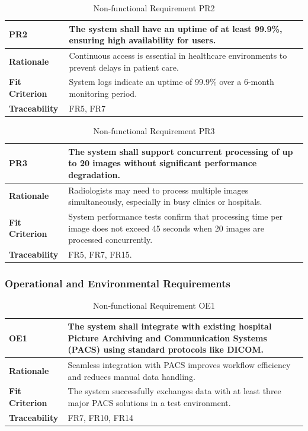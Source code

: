 \documentclass[12pt]{article}
\begin{document}
\begin{table}[h!]
\centering
{}
\begin{tabular}{|p{3.5cm}|p{11.5cm}|}
\hline
\rowcolor{gray!30}
\textbf{PR2} & The system shall have an uptime of at least 99.9\%, ensuring high availability for users. \\
\hline
\textbf{Rationale} & Continuous access is essential in healthcare environments to prevent delays in patient care. \\
\hline
\textbf{Fit Criterion} & System logs indicate an uptime of 99.9\% over a 6-month monitoring period. \\
\hline
\textbf{Traceability} & FR5, FR7 \\
\hline
\end{tabular}
\caption{Non-functional Requirement PR2}
\end{table}

\begin{table}[h!]
\centering
{}
\begin{tabular}{|p{3.5cm}|p{11.5cm}|}
\hline
\rowcolor{gray!30}
\textbf{PR3} & The system shall support concurrent processing of up to 20 images without significant performance degradation. \\
\hline
\textbf{Rationale} & Radiologists may need to process multiple images simultaneously, especially in busy clinics or hospitals. \\
\hline
\textbf{Fit Criterion} & System performance tests confirm that processing time per image does not exceed 45 seconds when 20 images are processed concurrently. \\
\hline
\textbf{Traceability} & FR5, FR7, FR15. \\
\hline
\end{tabular}
\caption{Non-functional Requirement PR3}
\end{table}
\newpage
\subsubsection{Operational and Environmental Requirements}

\begin{table}[h!]
\centering
{}
\begin{tabular}{|p{3.5cm}|p{11.5cm}|}
\hline
\rowcolor{gray!30}
\textbf{OE1} & The system shall integrate with existing hospital Picture Archiving and Communication Systems (PACS) using standard protocols like DICOM. \\
\hline
\textbf{Rationale} & Seamless integration with PACS improves workflow efficiency and reduces manual data handling. \\
\hline
\textbf{Fit Criterion} & The system successfully exchanges data with at least three major PACS solutions in a test environment. \\
\hline
\textbf{Traceability} & FR7, FR10, FR14 \\
\hline
\end{tabular}
\caption{Non-functional Requirement OE1}
\end{table}
\end{document}
